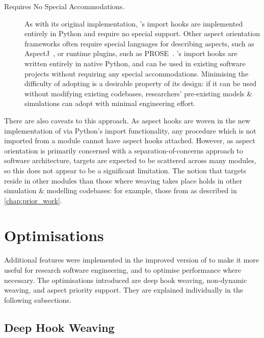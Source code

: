 \begin{description}
    \item[Requires No Special Accommodations.] As with its original
        implementation, \pdsf{}'s import hooks are implemented entirely in
        Python and require no special support. Other aspect orientation
        frameworks often require special languages for describing aspects, such
        as AspectJ~\cite{AspectJLanguageAndTools}, or runtime plugins, such as
        PROSE~\cite{popovici2002PROSE}. \pdsf{}'s import hooks are written
        entirely in native Python, and can be used in existing software projects
        without requiring any special accommodations. Minimising the difficulty
        of adopting \pdsf{} is a desirable property of its design: if it can be
        used without modifying existing codebases, researchers' pre-existing
        models \& simulations can adopt \pdsf{} with minimal engineering effort.
\end{description}

There are also caveats to this approach. As aspect hooks are woven in the new
implementation of \pdsf{} via Python's import functionality, any procedure which
is not imported from a module cannot have aspect hooks attached.
 However, as aspect
orientation is primarily concerned with a separation-of-concerns approach to
software architecture, targets are expected to be scattered across many modules,
so this does not appear to be a significant limitation. The notion that targets
reside in other modules than those where weaving takes place holds in other
\aspectoriented{} simulation \& modelling codebases: for example, those from
\citet{wallis2018caise} as described in \cref{chap:prior_work}.



\section{Optimisations}
\label{pdsf3_optimisations}

Additional features were implemented in the improved version of \pdsf to make it
more useful for research software engineering, and to optimise performance where
necessary. The optimisations introduced are deep hook weaving, non-dynamic
weaving, and aspect priority support. They are explained individually in the
following subsections.

\subsection{Deep Hook Weaving}\label{deep_hook_weaving}

